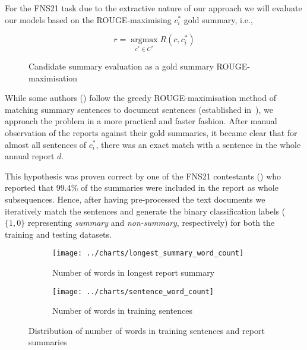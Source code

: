 For the FNS21 task due to the extractive nature of our approach we will evaluate our models based on the ROUGE-maximising $c^{*}_{i}$ gold summary, i.e.,

\begin{figure}[h]
    \centering
    \begin{equation}\label{eq:rouge_max}
        r = \underset{c^{*} \in C^{*}}{\operatorname{argmax}} R(c, c^{*}_{i})
    \end{equation}
    \caption{Candidate summary evaluation as a gold summary ROUGE-maximisation}
    \label{fig:rouge_max}
\end{figure}


While some authors (\cite{zmandar-etal-2021-joint}) follow the greedy ROUGE-maximisation method of matching summary sentences to document sentences (established in~\cite{nallapati2017summarunner}), we approach the problem in a more practical and faster fashion.
After manual observation of the reports against their gold summaries, it became clear that for almost all sentences of $c^{*}_{i}$, there was an exact match with a sentence in the whole annual report $d$.

This hypothesis was proven correct by one of the FNS21 contestants (\cite{orzhenovskii-2021-t5}) who reported that 99.4\% of the summaries were included in the
report as whole subsequences.
Hence, after having pre-processed the text documents we iteratively match the sentences and generate the binary classification labels ($\{1,0\}$ representing \emph{summary} and \emph{non-summary}, respectively) for both the training and testing datasets.

\begin{figure}[ht]
    \begin{subfigure}{0.49\textwidth}
        \centering        \texttt{[image: ../charts/longest\_summary\_word\_count]}
        \caption{Number of words in longest report summary}
        \label{fig:longest_summary_word_count}
    \end{subfigure}%
    \hfill
    \begin{subfigure}{0.49\textwidth}
        \centering
        \texttt{[image: ../charts/sentence\_word\_count]}
        \caption{Number of words in training sentences}
        \label{fig:sentence_word_count}
    \end{subfigure}
    \caption{Distribution of number of words in training sentences and report summaries}
    \label{fig:word_count}
\end{figure}